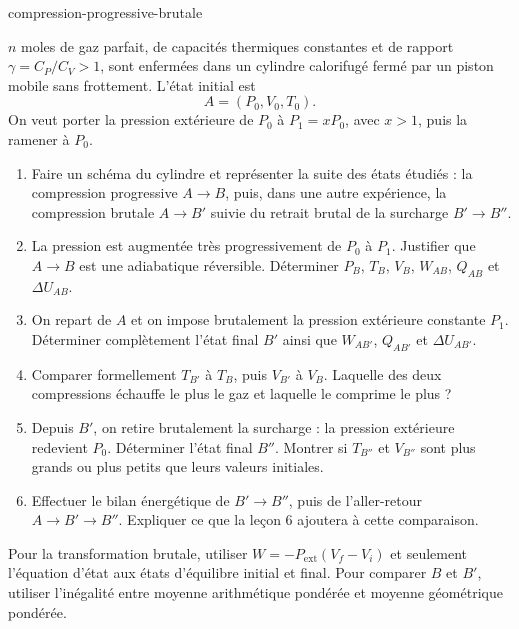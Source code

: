 \begin{exo}{compression-progressive-brutale}

$n$ moles de gaz parfait, de capacités thermiques constantes et de rapport
$\gamma=C_P/C_V>1$, sont enfermées dans un cylindre calorifugé fermé par un
piston mobile sans frottement. L'état initial est
\[
A=(P_0,V_0,T_0).
\]
On veut porter la pression extérieure de $P_0$ à $P_1=xP_0$, avec $x>1$,
puis la ramener à $P_0$.

\begin{enumerate}
\item Faire un schéma du cylindre et représenter la suite des états étudiés :
la compression progressive $A\to B$, puis, dans une autre expérience, la
compression brutale $A\to B'$ suivie du retrait brutal de la surcharge
$B'\to B''$.
\item La pression est augmentée très progressivement de $P_0$ à $P_1$.
Justifier que $A\to B$ est une adiabatique réversible. Déterminer
$P_B$, $T_B$, $V_B$, $W_{AB}$, $Q_{AB}$ et $\Delta U_{AB}$.
\item On repart de $A$ et on impose brutalement la pression extérieure
constante $P_1$. Déterminer complètement l'état final $B'$ ainsi que
$W_{AB'}$, $Q_{AB'}$ et $\Delta U_{AB'}$.
\item Comparer formellement $T_{B'}$ à $T_B$, puis $V_{B'}$ à $V_B$.
Laquelle des deux compressions échauffe le plus le gaz et laquelle le comprime
le plus ?
\item Depuis $B'$, on retire brutalement la surcharge : la pression extérieure
redevient $P_0$. Déterminer l'état final $B''$. Montrer si $T_{B''}$ et
$V_{B''}$ sont plus grands ou plus petits que leurs valeurs initiales.
\item Effectuer le bilan énergétique de $B'\to B''$, puis de l'aller-retour
$A\to B'\to B''$. Expliquer ce que la leçon 6 ajoutera à cette comparaison.
\end{enumerate}

\begin{indication}
Pour la transformation brutale, utiliser
$W=-P_{\mathrm{ext}}(V_f-V_i)$ et seulement l'équation d'état aux états
d'équilibre initial et final. Pour comparer $B$ et $B'$, utiliser l'inégalité
entre moyenne arithmétique pondérée et moyenne géométrique pondérée.
\end{indication}


\end{exo}
